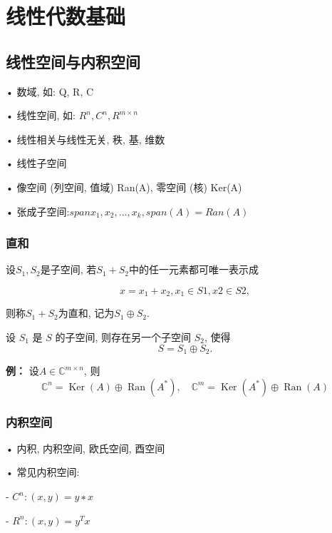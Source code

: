 \documentclass[12pt,a4paper]{article}
\begin{document}
\section{线性代数基础}
\subsection{线性空间与内积空间}
• 数域, 如: Q, R, C

• 线性空间, 如: $R^n,C^n,R^{m×n}$

• 线性相关与线性无关, 秩, 基, 维数

• 线性子空间

• 像空间 (列空间, 值域) Ran(A), 零空间 (核) Ker(A)

• 张成子空间:$span{x_1, x_2, . . . , x_k}, span(A) = Ran(A)$

\subsubsection{直和}
设$S_1, S_2$是子空间, 若$S_1 + S_2$中的任一元素都可唯一表示成

$$x = x_1 + x_2, x_1 ∈ S1, x2 ∈ S2,$$

则称$S_1 + S_2$为直和, 记为$S_1 ⊕ S_2$.

\begin{framed}
	\begin{theorem}
		
		设 $S_1$ 是 $S$ 的子空间, 则存在另一个子空间 $S_2$, 使得$$S = S_1 ⊕ S_2.$$
		
	\end{theorem}
\end{framed}

\begin{framed}
		
		{\bfseries 例：} \quad 设$A ∈\mathbb{C}^{m×n}$, 则
		$$\mathbb{C}^{n}=\operatorname{Ker}(A) \oplus \operatorname{Ran}\left(A^{*}\right), \quad \mathbb{C}^{m}=\operatorname{Ker}\left(A^{*}\right) \oplus \operatorname{Ran}(A)$$ 
		
\end{framed}

\subsubsection{内积空间}
• 内积, 内积空间, 欧氏空间, 酉空间

• 常见内积空间:

\qquad - $C^{n} : (x, y) = y∗x$

\qquad - $R^{n} : (x, y) = y^{T}x$
\end{document}
